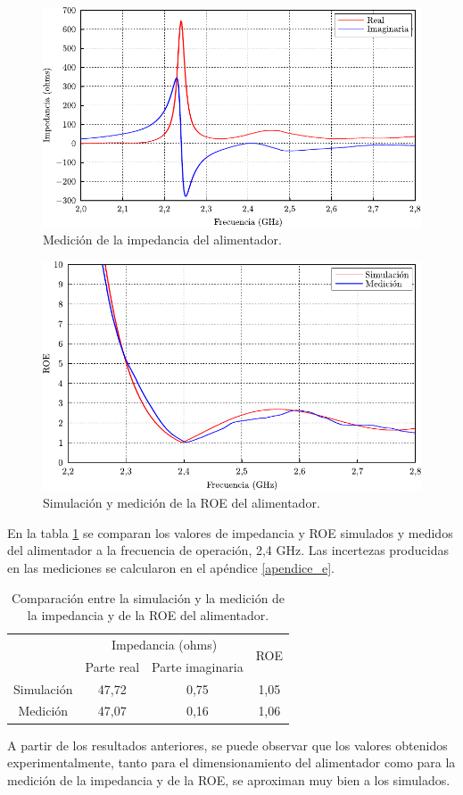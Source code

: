 \begin{figure}[H]
\centering
\includegraphics[scale = 1]{Figures/Resultados/resultados_14}
\caption{Medición de la impedancia del alimentador.}
\label{fig_resultados:14}
\end{figure}
\begin{figure}[H]
\centering
\includegraphics[scale = 1]{Figures/Resultados/resultados_15}
\caption{Simulación y medición de la ROE del alimentador.}
\label{fig_resultados:15}
\end{figure}
En la tabla \ref{tabla_mediciones:2} se comparan los valores de impedancia y ROE simulados y medidos del alimentador a la frecuencia de operación, 2,4 GHz. Las incertezas producidas en las mediciones se calcularon en el apéndice \ref{apendice_e}.
\begin{table}[H]
\centering
\begin{tabular}{c|c|c|c|}
\cline{2-4}
& \multicolumn{2}{c|}{Impedancia (ohms)} & \multirow{2}{*}{ROE} \\
\cline{2-3}
& Parte real & Parte imaginaria & \\
\hline
\multicolumn{1}{|c|}{Simulación} & 47,72 & 0,75 & 1,05 \\
\hline
\multicolumn{1}{|c|}{Medición} & 47,07 & 0,16 & 1,06 \\
\hline
\end{tabular}
\caption{Comparación entre la simulación y la medición de la impedancia y de la ROE del alimentador.}
\label{tabla_mediciones:2}
\end{table}
A partir de los resultados anteriores, se puede observar que los valores obtenidos experimentalmente, tanto para el dimensionamiento del alimentador como para la medición de la impedancia y de la ROE, se aproximan muy bien a los simulados.


